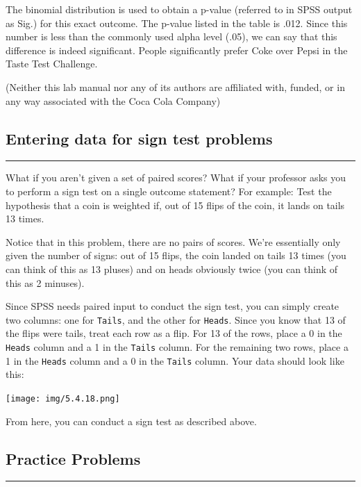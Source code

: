 \documentclass[]{book}
\begin{document}
The binomial distribution is used to obtain a p-value (referred to in
SPSS output as Sig.) for this exact outcome. The p-value listed in the
table is .012. Since this number is less than the commonly used alpha
level (.05), we can say that this difference is indeed significant.
People significantly prefer Coke over Pepsi in the Taste Test Challenge.

(Neither this lab manual nor any of its authors are affiliated with,
funded, or in any way associated with the Coca Cola Company)

\subsection{Entering data for sign test
problems}\label{entering-data-for-sign-test-problems}

\begin{center}\rule{0.5\linewidth}{0.5pt}\end{center}

What if you aren't given a set of paired scores? What if your professor
asks you to perform a sign test on a single outcome statement? For
example: Test the hypothesis that a coin is weighted if, out of 15 flips
of the coin, it lands on tails 13 times.

Notice that in this problem, there are no pairs of scores. We're
essentially only given the number of signs: out of 15 flips, the coin
landed on tails 13 times (you can think of this as 13 pluses) and on
heads obviously twice (you can think of this as 2 minuses).

Since SPSS needs paired input to conduct the sign test, you can simply
create two columns: one for \texttt{Tails}, and the other for
\texttt{Heads}. Since you know that 13 of the flips were tails, treat
each row as a flip. For 13 of the rows, place a 0 in the \texttt{Heads}
column and a 1 in the \texttt{Tails} column. For the remaining two rows,
place a 1 in the \texttt{Heads} column and a 0 in the \texttt{Tails}
column. Your data should look like this:

\texttt{[image: img/5.4.18.png]}

From here, you can conduct a sign test as described above.

\subsection{Practice Problems}\label{practice-problems-5}

\begin{center}\rule{0.5\linewidth}{0.5pt}\end{center}
\end{document}
